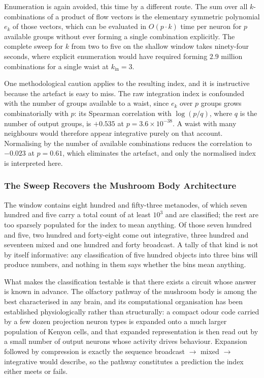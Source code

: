 \documentclass[12pt,a4paper,oneside]{article}
\theoremstyle{definition}
\theoremstyle{plain}
\newcommand{\kin}{k_{\mathrm{in}}}
\begin{document}
Enumeration is again avoided, this time by a different route. The sum over
all $k$-combinations of a product of flow vectors is the elementary
symmetric polynomial $e_k$ of those vectors, which can be evaluated in
$O(p \cdot k)$ time per neuron for $p$ available groups without ever forming
a single combination explicitly. The complete sweep for $k$ from two to five
on the shallow window takes ninety-four seconds, where explicit enumeration
would have required forming $2.9$ million combinations for a single waist at
$\kin = 3$.

One methodological caution applies to the resulting index, and it is
instructive because the artefact is easy to miss. The raw integration index
is confounded with the number of groups available to a waist, since $e_k$
over $p$ groups grows combinatorially with $p$: its Spearman correlation
with $\log(p/q)$, where $q$ is the number of output groups, is $+0.535$ at
$p = 3.6 \times 10^{-38}$. A waist with many neighbours would therefore
appear integrative purely on that account. Normalising by the number of
available combinations reduces the correlation to $-0.023$ at $p = 0.61$,
which eliminates the artefact, and only the normalised index is interpreted
here.

\subsubsection{The Sweep Recovers the Mushroom Body Architecture}

The window contains eight hundred and fifty-three metanodes, of which seven
hundred and five carry a total count of at least $10^3$ and are classified;
the rest are too sparsely populated for the index to mean anything. Of those
seven hundred and five, two hundred and forty-eight come out integrative,
three hundred and seventeen mixed and one hundred and forty broadcast. A tally of that kind
is not by itself informative: any classification of five hundred objects
into three bins will produce numbers, and nothing in them says whether the
bins mean anything.

What makes the classification testable is that there exists a circuit whose
answer is known in advance. The olfactory pathway of the mushroom body is
among the best characterised in any brain, and its computational
organisation has been established physiologically rather than structurally:
a compact odour code carried by a few dozen projection neuron types is
expanded onto a much larger population of Kenyon cells, and that expanded
representation is then read out by a small number of output neurons whose
activity drives behaviour. Expansion followed by compression is exactly the
sequence broadcast $\rightarrow$ mixed $\rightarrow$ integrative would
describe, so the pathway constitutes a prediction the index either meets or
fails.
\end{document}
